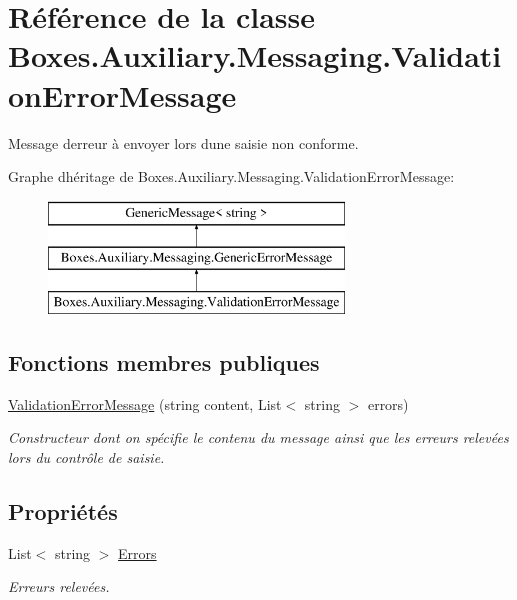 \hypertarget{class_boxes_1_1_auxiliary_1_1_messaging_1_1_validation_error_message}{}\section{Référence de la classe Boxes.\+Auxiliary.\+Messaging.\+Validation\+Error\+Message}
\label{class_boxes_1_1_auxiliary_1_1_messaging_1_1_validation_error_message}


Message d\textquotesingle{}erreur à envoyer lors d\textquotesingle{}une saisie non conforme.  


Graphe d\textquotesingle{}héritage de Boxes.\+Auxiliary.\+Messaging.\+Validation\+Error\+Message\+:\begin{figure}[H]
\begin{center}
\leavevmode
\includegraphics[height=3.000000cm]{class_boxes_1_1_auxiliary_1_1_messaging_1_1_validation_error_message}
\end{center}
\end{figure}
\subsection*{Fonctions membres publiques}
\begin{DoxyCompactItemize}
\item 
\hyperlink{class_boxes_1_1_auxiliary_1_1_messaging_1_1_validation_error_message_a0dec7ffb3e9beffaecc6f782d2bf3b0c}{Validation\+Error\+Message} (string content, List$<$ string $>$ errors)
\begin{DoxyCompactList}\small\item\em Constructeur dont on spécifie le contenu du message ainsi que les erreurs relevées lors du contrôle de saisie. \end{DoxyCompactList}\end{DoxyCompactItemize}
\subsection*{Propriétés}
\begin{DoxyCompactItemize}
\item 
List$<$ string $>$ \hyperlink{class_boxes_1_1_auxiliary_1_1_messaging_1_1_validation_error_message_ac2a0852a199c530aaf61506ff1037dac}{Errors}
\begin{DoxyCompactList}\small\item\em Erreurs relevées. \end{DoxyCompactList}\end{DoxyCompactItemize}


